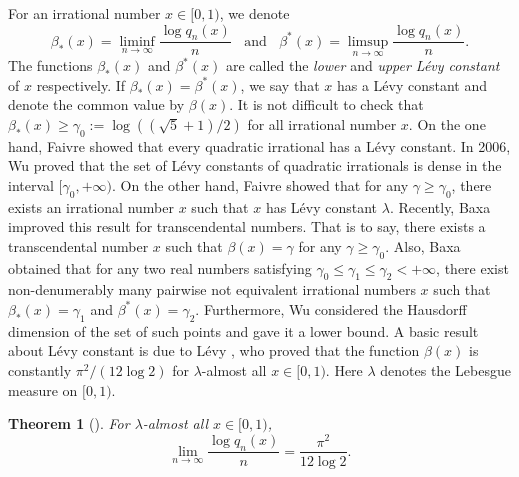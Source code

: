 \documentclass[reqno]{amsart}
\newtheorem{theorem}{Theorem}[section]
\theoremstyle{definition}
\numberwithin{equation}{section}
\begin{document}
For an irrational number $x \in [0,1)$, we denote
\[
\beta_*(x) = \liminf\limits_{n \to \infty}\frac{\log q_n(x)}{n}\ \ \ \ \text{and}\ \ \ \
\beta^*(x) = \limsup\limits_{n \to \infty}\frac{\log q_n(x)}{n}.
\]
The functions $\beta_*(x)$ and $\beta^*(x)$ are called the \emph{lower} and \emph{upper L\'{e}vy constant} of $x$ respectively. If $\beta_*(x) = \beta^*(x)$, we say that $x$ has a L\'{e}vy constant and denote the common value by $\beta(x)$. It is not difficult to check that $\beta_*(x) \geq \gamma_0:=\log((\sqrt{5}+1)/2)$ for all irrational number $x$. On the one hand, Faivre \cite{lesFai92} showed that every quadratic irrational has a L\'{e}vy constant. In 2006, Wu \cite{lesWu06} proved that the set of L\'{e}vy constants of quadratic irrationals is dense in the interval $[\gamma_0,+\infty)$.
On the other hand, Faivre \cite{lesFai97} showed that for any $\gamma \geq \gamma_0$, there exists an irrational number $x$ such that $x$ has L\'{e}vy constant $\lambda$. Recently, Baxa \cite{lesBaxa09} improved this result for transcendental numbers. That is to say, there exists a transcendental number $x$ such that $\beta(x)= \gamma$ for any $\gamma \geq \gamma_0$.
Also, Baxa \cite{lesBaxa99} obtained that for any two real numbers satisfying $\gamma_0\leq \gamma_1 \leq \gamma_2 < +\infty$, there exist non-denumerably many pairwise not equivalent irrational numbers $x$ such that $\beta_*(x) = \gamma_1$ and $\beta^*(x) = \gamma_2$. Furthermore, Wu \cite{lesWu06a} considered the Hausdorff dimension of the set of such points and gave it a lower bound.
A basic result about L\'{e}vy constant is due to L\'{e}vy \cite{lesLevy29}, who proved that the function $\beta(x)$ is constantly $\pi^2/(12\log2)$ for $\lambda$-almost all $x \in [0,1)$. Here $\lambda$ denotes the Lebesgue measure on $[0,1)$.

\begin{theorem}[\cite{lesLevy29}]\label{Levy theorem}
For $\lambda$-almost all $x \in [0,1)$,
\begin{equation*}
\lim\limits_{n \to \infty}\frac{\log q_n(x)}{n} = \frac{\pi^2}{12\log2}.
\end{equation*}
\end{theorem}
\end{document}
